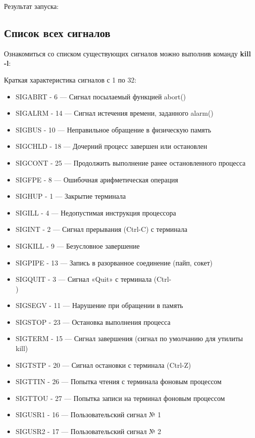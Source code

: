 \documentclass[a4paper]{article}
\begin{document}
	Результат запуска:
	
	
	\subsection{Список всех сигналов}
	Ознакомиться со списком существующих сигналов можно выполнив команду \textbf{kill -l}:
	
	
	Краткая характеристика сигналов с 1 по 32:
	\begin{itemize}
		\item SIGABRT -	6 --- Сигнал посылаемый функцией abort()
		\item SIGALRM - 14 --- Сигнал истечения времени, заданного alarm()
		\item SIGBUS - 10 --- Неправильное обращение в физическую память
		\item SIGCHLD - 18 --- Дочерний процесс завершен или остановлен
		\item SIGCONT - 25 --- Продолжить выполнение ранее остановленного процесса
		\item SIGFPE - 8 --- Ошибочная арифметическая операция
		\item SIGHUP - 1 --- Закрытие терминала
		\item SIGILL - 4 --- Недопустимая инструкция процессора
		\item SIGINT - 2 --- Сигнал прерывания (Ctrl-C) с терминала
		\item SIGKILL - 9 --- Безусловное завершение
		\item SIGPIPE - 13 --- Запись в разорванное соединение (пайп, сокет)
		\item SIGQUIT - 3 --- Сигнал «Quit» с терминала (Ctrl-\\)
		\item SIGSEGV - 11 --- Нарушение при обращении в память
		\item SIGSTOP - 23 --- Остановка выполнения процесса
		\item SIGTERM - 15 --- Сигнал завершения (сигнал по умолчанию для утилиты kill)
		\item SIGTSTP - 20 --- Сигнал остановки с терминала (Ctrl-Z)
		\item SIGTTIN - 26 --- Попытка чтения с терминала фоновым процессом	
		\item SIGTTOU - 27 --- Попытка записи на терминал фоновым процессом	
		\item SIGUSR1 - 16 --- Пользовательский сигнал № 1
		\item SIGUSR2 - 17 --- Пользовательский сигнал № 2

\end{itemize}
\end{document}
